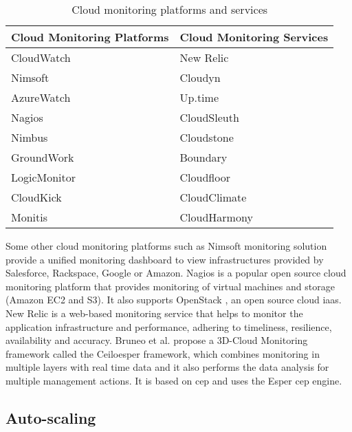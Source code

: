 \documentclass[article,type=msc,colorback,12pt,accentcolor=tud8b,table]{tudthesis}
\begin{document}
\begin{table}[h!]
  \centering
  \caption{Cloud monitoring platforms and services }
  \label{tab:Table1}
  \begin{tabular}{l|l}
  \hline
  \rowcolor[HTML]{FFD27F}  \textbf{Cloud Monitoring Platforms}  & \textbf{Cloud Monitoring Services} \\
    \hline
    CloudWatch \cite{cloudwatchdev} \cite{cloudwatch} & New Relic \cite{newrelic} \\    
    Nimsoft \cite{nimsoft} & Cloudyn \cite{cloudyn} \\        
    AzureWatch \cite{azurewatch} & Up.time \cite{uptime} \\        
    Nagios \cite{nagios} & CloudSleuth \cite{cloudsleuth} \\
    Nimbus \cite{nimbus} & Cloudstone \cite{cloudstone} \\ 
    GroundWork \cite{groundwork} & Boundary \cite{boundary} \\
    LogicMonitor \cite{logicmonitor} & Cloudfloor \cite{cloudfloor} \\ 
    CloudKick \cite{cloudkick} & CloudClimate \cite{cloudclimate} \\    
    Monitis \cite{monitis} & CloudHarmony \cite{cloudharmony} \\
    \hline
    
  \end{tabular}
\end{table}
	
	Some other cloud monitoring platforms such as Nimsoft monitoring solution \cite{nimsoft} provide a unified monitoring dashboard to view infrastructures provided by Salesforce, Rackspace, Google or Amazon. Nagios \cite{nagios} is a popular open source cloud monitoring platform that provides monitoring of virtual machines and storage (Amazon EC2 and S3). It also supports OpenStack \cite{openstack}, an open source cloud \gls{iaas}. New Relic \cite{newrelic} is a web-based monitoring service that helps to monitor the application infrastructure and performance, adhering to timeliness, resilience, availability and accuracy. Bruneo et al. \cite{bruneo2015framework} propose a 3D-Cloud Monitoring framework called the Ceiloesper framework, which combines monitoring in multiple layers with real time data and it also performs the data analysis for multiple management actions. It is based on \gls{cep} and uses the Esper \gls{cep} engine.	
	
	\subsection{Auto-scaling}	
	
\end{document}
